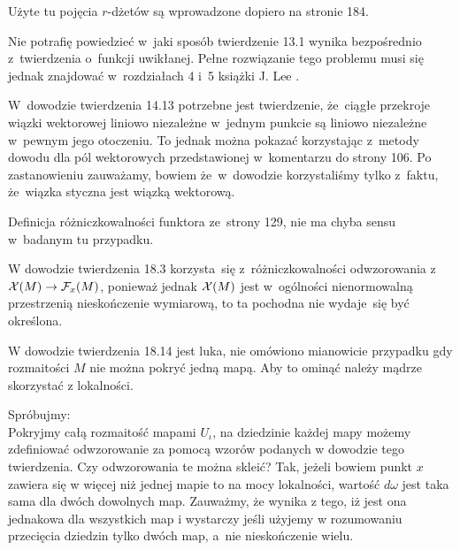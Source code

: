 \documentclass[a4paper,11pt]{article}
\begin{document}
\vspace{\spaceFour}



\start {} Użyte tu pojęcia $r$-dżetów są wprowadzone
dopiero na stronie 184.

\vspace{\spaceFour}



\start {} Nie potrafię powiedzieć w~jaki sposób twierdzenie
13.1 wynika bezpośrednio z~twierdzenia o~funkcji uwikłanej. Pełne
rozwiązanie tego problemu musi się jednak znajdować w~rozdziałach 4
i~5 książki J. Lee \cite{LeeIntroductionToSmoothManifolds2013}.

\vspace{\spaceFour}



\start {} W~dowodzie twierdzenia 14.13 potrzebne jest
twierdzenie, że~ciągłe przekroje wiązki wektorowej liniowo niezależne
w~jednym punkcie są liniowo niezależne w~pewnym jego otoczeniu. To
jednak można pokazać korzystając z~metody dowodu dla pól wektorowych
przedstawionej w~komentarzu do strony 106. Po zastanowieniu zauważamy,
bowiem że~w~dowodzie korzystaliśmy tylko z~faktu, że~wiązka styczna
jest wiązką wektorową.

\vspace{\spaceFour}



\start {} Definicja różniczkowalności funktora ze~strony 129,
nie ma chyba sensu w~badanym tu przypadku.

\vspace{\spaceFour}



\start {} W dowodzie twierdzenia 18.3 korzysta~się
z~różniczkowalności odwzorowania
z~$\mathcal{X}( M ) \to \mathcal{F}_{ x }( M )$, ponieważ jednak
$\mathcal{X}( M )$ jest w~ogólności nienormowalną przestrzenią
nieskończenie wymiarową, to ta pochodna nie wydaje~się być określona.

\vspace{\spaceFour}



\start {} W dowodzie twierdzenia 18.14 jest luka, nie omówiono
mianowicie przypadku gdy rozmaitości $M$ nie można pokryć jedną mapą. Aby
to ominąć należy mądrze skorzystać z lokalności.

Spróbujmy: \\
Pokryjmy całą rozmaitość mapami $U_{ \iota }$, na dziedzinie każdej
mapy możemy zdefiniować odwzorowanie za pomocą wzorów podanych w
dowodzie tego twierdzenia. Czy odwzorowania te można skleić? Tak,
jeżeli bowiem punkt $x$ zawiera się w więcej niż jednej mapie to na
mocy lokalności, wartość $d \omega$ jest taka sama dla dwóch dowolnych
map. Zauważmy, że wynika z tego, iż jest ona jednakowa dla wszystkich
map i wystarczy jeśli użyjemy w rozumowaniu przecięcia dziedzin tylko
dwóch map, a~nie nieskończenie wielu.
\end{document}
